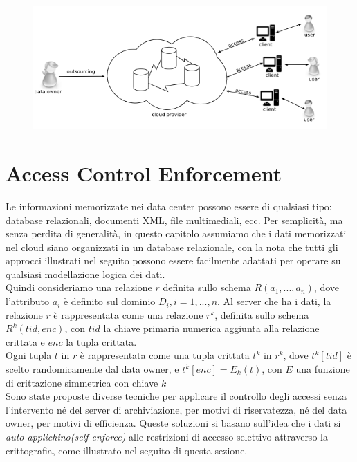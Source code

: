 \begin{figure}[h]
    \centering
    \includegraphics[width=1\linewidth]{paper_selective-and-private-access-to-outsourced-data-centers/image0.png}
    \label{fig-1}
\end{figure}

\section{Access Control Enforcement}
Le informazioni memorizzate nei data center possono essere di qualsiasi tipo: database relazionali, documenti XML, file multimediali, ecc. Per semplicità, ma senza perdita di generalità, in questo capitolo assumiamo che i dati memorizzati nel cloud siano organizzati in un database relazionale, con la nota che tutti gli approcci illustrati nel seguito possono essere facilmente adattati per operare su qualsiasi modellazione logica dei dati.
\\
\newline
Quindi consideriamo una relazione $r$ definita sullo schema $R(a_1,...,a_n)$, dove l'attributo $a_i$ è definito sul dominio $D_i, i = 1,...,n$. 
Al server che ha i dati, la relazione $r$ è rappresentata come una relazione $r^k$, definita sullo schema $R^k(tid,enc)$, con $tid$ la chiave primaria numerica aggiunta alla relazione crittata e $enc$ la tupla crittata.
\\
Ogni tupla $t$ in $r$ è rappresentata come una tupla crittata $t^k$ in $r^k$, dove $t^k[tid]$ è scelto randomicamente dal data owner, e $t^k[enc]=E_k(t)$, con $E$ una funzione di crittazione simmetrica con chiave $k$
\\
\newline
Sono state proposte diverse tecniche per applicare il controllo degli accessi senza l'intervento né del server di archiviazione, per motivi di riservatezza, né del data owner, per motivi di efficienza.
Queste soluzioni si basano sull'idea che i dati si \textit{auto-applichino(self-enforce)} alle restrizioni di accesso selettivo attraverso la crittografia, come illustrato nel seguito di questa sezione.

